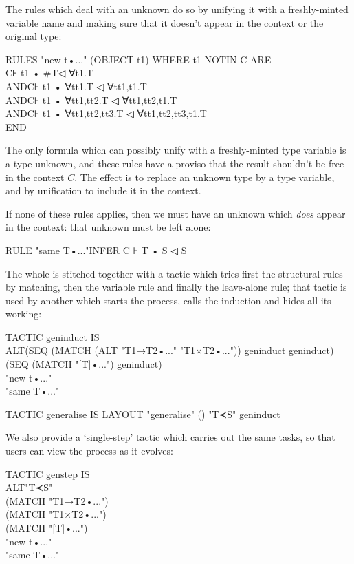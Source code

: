 The rules which deal with an unknown do so by unifying it with a freshly-minted variable name and making sure that it doesn't appear in the context or the original type:
\begin{japeish}
RULES "new t•..." (OBJECT t1) WHERE t1 NOTIN C ARE\\
\tab C⊦ t1 • \#T◁ ∀t1.T \\
AND\tab C⊦ t1 • ∀tt1.T ◁ ∀tt1,t1.T \\
AND\tab C⊦ t1 • ∀tt1,tt2.T ◁ ∀tt1,tt2,t1.T \\
AND\tab C⊦ t1 • ∀tt1,tt2,tt3.T ◁ ∀tt1,tt2,tt3,t1.T \\
END
\end{japeish}
The only formula which can possibly unify with a freshly-minted type variable is a type unknown, and these rules have a proviso that the result shouldn't be free in the context $C$. The effect is to replace an unknown type by a type variable, and by unification to include it in the context.

If none of these rules applies, then we must have an unknown which \textit{does} appear in the context: that unknown must be left alone:
\begin{japeish}
RULE "same T•..."\tab INFER C ⊦ T • S ◁ S
\end{japeish}

The whole is stitched together with a tactic which tries first the structural rules by matching, then the variable rule and finally the leave-alone rule; that tactic is used by another which starts the process, calls the induction and hides all its working:
\begin{japeish}
TACTIC geninduct IS \\
\tab ALT\tab (SEQ (MATCH (ALT "T1→T2•..." "T1×T2•...")) geninduct geninduct) \\
\tab \tab (SEQ (MATCH "[T]•...") geninduct)\\
\tab \tab "new t•..."\\
\tab \tab "same T•..."
\end{japeish}
\begin{japeish}
TACTIC generalise IS LAYOUT "generalise" () "T≺S" geninduct
\end{japeish}

We also provide a `single-step' tactic which carries out the same tasks, so that users can view the process as it evolves:
\begin{japeish}
TACTIC genstep IS \\
\tab ALT\tab "T≺S" \\
\tab \tab (MATCH "T1→T2•...") \\
\tab \tab (MATCH "T1×T2•...") \\
\tab \tab (MATCH "[T]•...") \\
\tab \tab "new t•..."\\
\tab \tab "same T•..."
\end{japeish}

